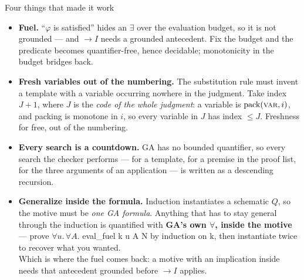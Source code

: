 \documentclass[aspectratio=169,11pt]{beamer}
\newcommand{\code}[1]{{\ttfamily\footnotesize #1}}
\newcommand{\key}[1]{{\color{accent}\textbf{#1}}}
\begin{document}
\begin{frame}{Four things that made it work}
  \vfill
  \small
  \begin{itemize}\itemsep0.4em
    \item \key{Fuel.} ``$\varphi$ is satisfied'' hides an $\exists$ over the evaluation
          budget, so it is not grounded --- and $\to I$ needs a grounded antecedent.
          Fix the budget and the predicate becomes quantifier-free, hence decidable;
          monotonicity in the budget bridges back.
    \item \key{Fresh variables out of the numbering.} The substitution rule must invent
          a template with a variable occurring nowhere in the judgment. Take index
          $J+1$, where $J$ is the \emph{code of the whole judgment}: a variable is
          $\mathrm{pack}(\textsc{var}, i)$, and packing is monotone in $i$, so every
          variable in $J$ has index $\leq J$. Freshness for free, out of the numbering.
    \item \key{Every search is a countdown.} GA has no bounded quantifier, so every
          search the checker performs --- for a template, for a premise in the proof
          list, for the three arguments of an application --- is written as a
          descending recursion.
    \item \key{Generalize inside the formula.} Induction instantiates a schematic
          $Q$, so the motive must be \emph{one GA formula}. Anything that has to stay
          general through the induction is quantified with \key{GA's own $\forall$,
          inside the motive} --- prove $\forall u.\,\forall A.$
          \code{eval\_fuel k u A N} by induction on \code{k}, then instantiate
          twice to recover what you wanted.\\
          {\footnotesize Which is where the fuel comes back: a motive with an
           implication inside needs that antecedent grounded before $\to I$ applies.}
  \end{itemize}
  \vfill
\end{frame}
\end{document}
